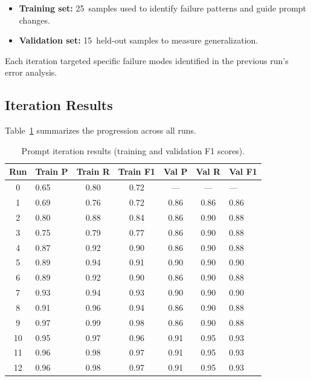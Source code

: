 \documentclass[12pt]{article}
\begin{document}
\begin{itemize}
    \item \textbf{Training set:} 25~samples used to identify failure
          patterns and guide prompt changes.
    \item \textbf{Validation set:} 15~held-out samples to measure
          generalization.
\end{itemize}

Each iteration targeted specific failure modes identified in the previous
run's error analysis.

\subsection{Iteration Results}

Table~\ref{tab:iterations} summarizes the progression across all runs.

\begin{table}[ht]
\centering
\caption{Prompt iteration results (training and validation F1 scores).}
\label{tab:iterations}
\small
\begin{tabular}{@{}clccccl@{}}
\toprule
\textbf{Run} & \textbf{Train P} & \textbf{Train R} & \textbf{Train F1}
& \textbf{Val P} & \textbf{Val R} & \textbf{Val F1} \\
\midrule
0  & 0.65 & 0.80 & 0.72 & ---  & ---  & ---  \\
1  & 0.69 & 0.76 & 0.72 & 0.86 & 0.86 & 0.86 \\
2  & 0.80 & 0.88 & 0.84 & 0.86 & 0.90 & 0.88 \\
3  & 0.75 & 0.79 & 0.77 & 0.86 & 0.90 & 0.88 \\
4  & 0.87 & 0.92 & 0.90 & 0.86 & 0.90 & 0.88 \\
5  & 0.89 & 0.94 & 0.91 & 0.90 & 0.90 & 0.90 \\
6  & 0.89 & 0.92 & 0.90 & 0.86 & 0.90 & 0.88 \\
7  & 0.93 & 0.94 & 0.93 & 0.90 & 0.90 & 0.90 \\
8  & 0.91 & 0.96 & 0.94 & 0.86 & 0.90 & 0.88 \\
9  & 0.97 & 0.99 & 0.98 & 0.86 & 0.90 & 0.88 \\
10 & 0.95 & 0.97 & 0.96 & 0.91 & 0.95 & 0.93 \\
11 & 0.96 & 0.98 & 0.97 & 0.91 & 0.95 & 0.93 \\
12 & 0.96 & 0.98 & 0.97 & 0.91 & 0.95 & 0.93 \\
\bottomrule
\end{tabular}
\end{table}
\end{document}
